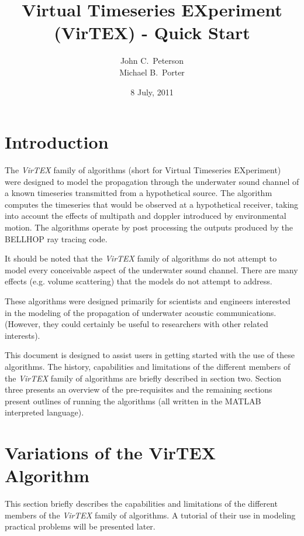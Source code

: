 \documentclass[12pt, letterpaper, oneside]{article}
\begin{document}
\title{Virtual Timeseries EXperiment (VirTEX) - Quick Start}
\author{John C.~Peterson\\Michael B.~Porter}
\date{8 July, 2011}
\maketitle
\thispagestyle{empty}

\section{Introduction}
\parindent 0pt
\parskip 12pt

The {\em VirTEX} family of algorithms (short for Virtual Timeseries
EXperiment) were designed to model the propagation through the underwater
sound channel of a known timeseries transmitted from a hypothetical
source. The algorithm computes the timeseries that would be observed at
a hypothetical receiver, taking into account the effects of multipath
and doppler introduced by environmental motion.  The algorithms operate
by post processing the outputs produced by the BELLHOP ray tracing code.

It should be noted that the {\em VirTEX} family of algorithms do
not attempt to model every conceivable aspect of the underwater
sound channel. There are many effects (e.g. volume scattering)
that the models do not attempt to address.

These algorithms were designed primarily for scientists and
engineers interested in the modeling of the propagation of underwater
acoustic communications. (However, they could certainly be useful to
researchers with other related interests).

This document is designed to assist users in getting started with
the use of these algorithms. The history, capabilities and limitations
of the different members of the {\em VirTEX} family of algorithms are
briefly described in section two. Section three presents an overview of
the pre-requisites and the remaining sections present outlines of
running the algorithms (all written in the MATLAB interpreted language).

\section{Variations of the VirTEX Algorithm}

This section briefly describes the capabilities and limitations of the
different members of the {\em VirTEX} family of algorithms. A tutorial of
their use in modeling practical problems will be presented later.
\end{document}
